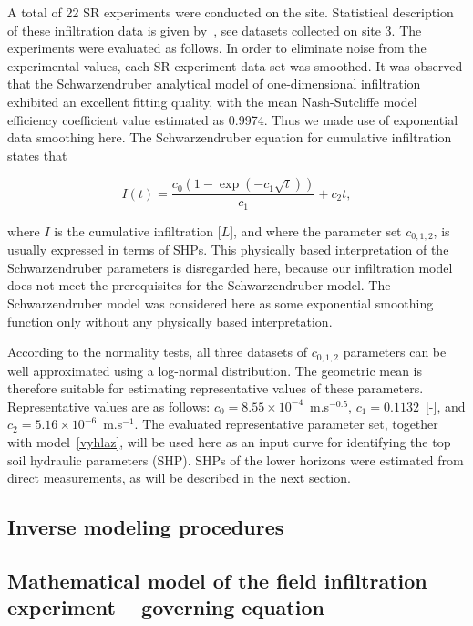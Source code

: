 \documentclass[review]{myarticle}
\newenvironment{lineq}
    {\begin{linenomath*}
    \begin{equation}
    }
    { 
    \end{equation} 
    \end{linenomath*}
    }
\begin{document}
A total of 22 SR experiments were conducted on the site. Statistical description of these infiltration data is given by~\citep{jacka-site}, see datasets collected on site 3. The experiments were evaluated as follows. In order to eliminate noise from the experimental values, each SR experiment data set was smoothed. It was observed that the Schwarzendruber analytical model of one-dimensional infiltration exhibited an excellent fitting quality, with the mean  Nash-Sutcliffe model efficiency coefficient value estimated as 0.9974. Thus we made use of  exponential data smoothing here. The Schwarzendruber equation for cumulative infiltration  states that
\begin{lineq}
I(t)=\frac{c_0\left(1-\exp\left(-c_1\sqrt{t}\right)\right)}{c_1}+c_2t,
\label{vyhlaz}
\end{lineq}
where $I$ is the cumulative infiltration [$L$], and where the parameter set $c_{0,1,2}$, is usually expressed in terms of SHPs. This physically based interpretation of the Schwarzendruber parameters is disregarded here, because our infiltration model does not meet the prerequisites for the Schwarzendruber model. The Schwarzendruber model was  considered here as some exponential smoothing function only without any physically  based interpretation.


According to the normality tests,  all three datasets of $c_{0,1,2}$ parameters can be well approximated  using a log-normal distribution. The geometric mean is therefore suitable for estimating representative values of these parameters. Representative values are as follows: $c_0 = 8.55\times 10^{-4}$~m.s$^{-0.5}$, $c_1 = 0.1132$~[-], and $c_2 = 5.16\times 10^{-6}$~m.s$^{-1}$. The evaluated representative  parameter set, together with  model~\eqref{vyhlaz}, will be used here as an input curve for identifying the top soil hydraulic parameters (SHP). SHPs of the lower horizons were estimated from direct measurements, as will be described in the next section.






\subsection{Inverse modeling procedures}
\label{invproc}

\subsection{Mathematical model of the field infiltration experiment -- governing equation}%
\label{goveq}
\end{document}
